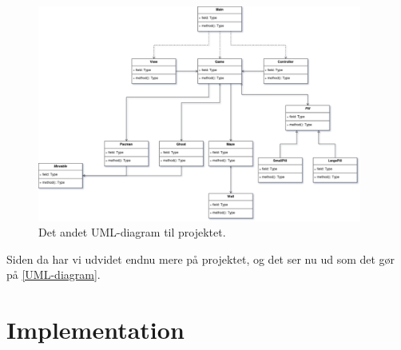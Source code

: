 \documentclass{article}
\theoremstyle{mytheoremstyle}
\theoremstyle{mytheoremstyle}
\theoremstyle{myproblemstyle}
\begin{document}
\begin{figure}[H]
    \begin{center}
        \includegraphics[width=0.95\textwidth]{figures/UML-diagram-old2.png}
    \end{center}
    \caption{Det andet UML-diagram til projektet.}
    \label{UML-diagram-old2}
\end{figure}
Siden da har vi udvidet endnu mere på projektet, og det ser nu ud som det gør på
\autoref{UML-diagram}.



\section{Implementation}\label{sec:Implementation} %
\end{document}
